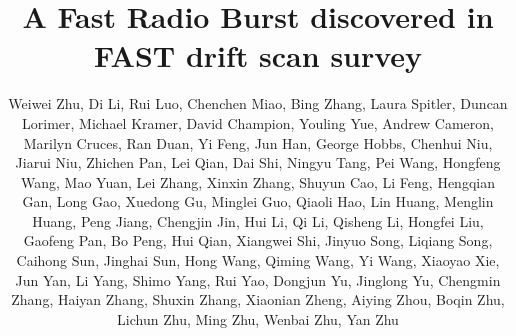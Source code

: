 \documentclass[iop,apj,numberedappendix,appendixfloats]{emulateapj}
\begin{document}

\title{A Fast Radio Burst discovered in FAST drift scan survey}

\author{
Weiwei Zhu,
Di Li,
Rui Luo,
Chenchen Miao,
Bing Zhang,
Laura Spitler,
Duncan Lorimer,
Michael Kramer,
David Champion,
Youling Yue,
Andrew Cameron,
Marilyn Cruces,
Ran Duan,
Yi Feng,
Jun Han,
George Hobbs,
Chenhui Niu,
Jiarui Niu,
Zhichen Pan,
Lei Qian,
Dai Shi,
Ningyu Tang,
Pei Wang,
Hongfeng Wang,
Mao Yuan,
Lei Zhang,
Xinxin Zhang,
Shuyun Cao,
Li Feng,
Hengqian Gan,
Long Gao,
Xuedong Gu,
Minglei Guo,
Qiaoli Hao,
Lin Huang,
Menglin Huang,
Peng Jiang,
Chengjin Jin,
Hui Li,
Qi Li,
Qisheng Li,
Hongfei Liu,
Gaofeng Pan,
Bo Peng,
Hui Qian,
Xiangwei Shi, 
Jinyuo Song,
Liqiang Song,
Caihong Sun,
Jinghai Sun,
Hong Wang,
Qiming Wang,
Yi Wang,
Xiaoyao Xie,
Jun Yan,
Li Yang,
Shimo Yang,
Rui Yao,
Dongjun Yu,
Jinglong  Yu,
Chengmin Zhang,
Haiyan Zhang,
Shuxin Zhang,
Xiaonian Zheng,
Aiying Zhou,
Boqin Zhu,
Lichun Zhu,
Ming Zhu,
Wenbai Zhu,
Yan Zhu
}
\end{document}
